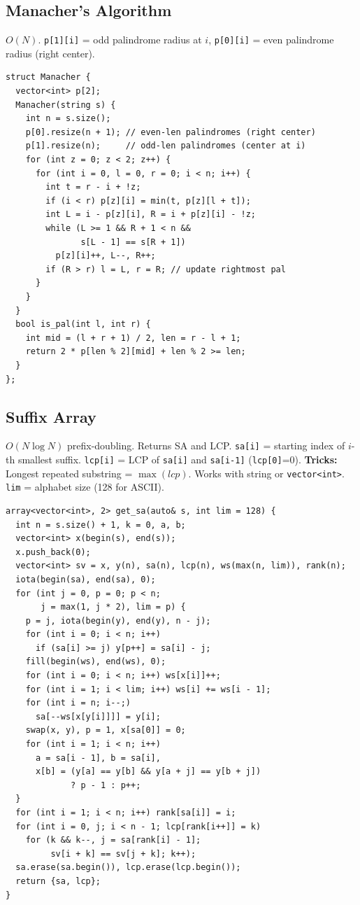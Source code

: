 \subsection{Manacher's Algorithm}
$O(N)$. \texttt{p[1][i]} = odd palindrome radius at $i$, \texttt{p[0][i]} = even palindrome radius (right center).
\begin{verbatim}
struct Manacher {
  vector<int> p[2];
  Manacher(string s) {
    int n = s.size();
    p[0].resize(n + 1); // even-len palindromes (right center)
    p[1].resize(n);     // odd-len palindromes (center at i)
    for (int z = 0; z < 2; z++) {
      for (int i = 0, l = 0, r = 0; i < n; i++) {
        int t = r - i + !z;
        if (i < r) p[z][i] = min(t, p[z][l + t]);
        int L = i - p[z][i], R = i + p[z][i] - !z;
        while (L >= 1 && R + 1 < n &&
               s[L - 1] == s[R + 1])
          p[z][i]++, L--, R++;
        if (R > r) l = L, r = R; // update rightmost pal
      }
    }
  }
  bool is_pal(int l, int r) {
    int mid = (l + r + 1) / 2, len = r - l + 1;
    return 2 * p[len % 2][mid] + len % 2 >= len;
  }
};
\end{verbatim}
\subsection{Suffix Array}
$O(N \log N)$ prefix-doubling. Returns SA and LCP.
\texttt{sa[i]} = starting index of $i$-th smallest suffix.
\texttt{lcp[i]} = LCP of \texttt{sa[i]} and \texttt{sa[i-1]} (\texttt{lcp[0]}=0).
\textbf{Tricks:} Longest repeated substring = $\max(lcp)$.
Works with string or \texttt{vector<int>}. \texttt{lim} = alphabet size (128 for ASCII).
\begin{verbatim}
array<vector<int>, 2> get_sa(auto& s, int lim = 128) {
  int n = s.size() + 1, k = 0, a, b;
  vector<int> x(begin(s), end(s));
  x.push_back(0);
  vector<int> sv = x, y(n), sa(n), lcp(n), ws(max(n, lim)), rank(n);
  iota(begin(sa), end(sa), 0);
  for (int j = 0, p = 0; p < n;
       j = max(1, j * 2), lim = p) {
    p = j, iota(begin(y), end(y), n - j);
    for (int i = 0; i < n; i++)
      if (sa[i] >= j) y[p++] = sa[i] - j;
    fill(begin(ws), end(ws), 0);
    for (int i = 0; i < n; i++) ws[x[i]]++;
    for (int i = 1; i < lim; i++) ws[i] += ws[i - 1];
    for (int i = n; i--;)
      sa[--ws[x[y[i]]]] = y[i];
    swap(x, y), p = 1, x[sa[0]] = 0;
    for (int i = 1; i < n; i++)
      a = sa[i - 1], b = sa[i],
      x[b] = (y[a] == y[b] && y[a + j] == y[b + j])
             ? p - 1 : p++;
  }
  for (int i = 1; i < n; i++) rank[sa[i]] = i;
  for (int i = 0, j; i < n - 1; lcp[rank[i++]] = k)
    for (k && k--, j = sa[rank[i] - 1];
         sv[i + k] == sv[j + k]; k++);
  sa.erase(sa.begin()), lcp.erase(lcp.begin());
  return {sa, lcp};
}
\end{verbatim}
